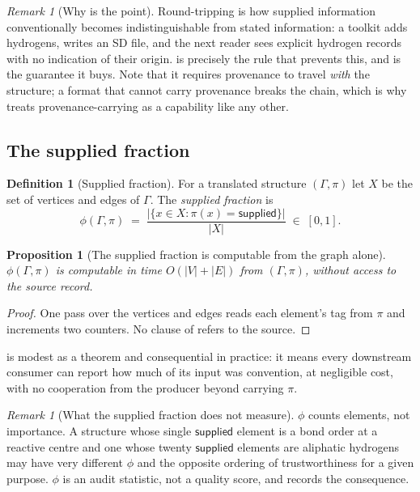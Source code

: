 \documentclass[11pt,twocolumn,a4paper]{article}
\theoremstyle{msthm}
\newtheorem{proposition}[theorem]{Proposition}
\theoremstyle{definition}
\newtheorem{definition}[theorem]{Definition}
\theoremstyle{remark}
\newtheorem{remark}[theorem]{Remark}
\newcommand{\Gph}{\Gamma}
\newcommand{\V}{V}
\newcommand{\E}{E}
\newcommand{\Prov}{\pi}
\newcommand{\abs}[1]{\lvert#1\rvert}
\newcommand{\supplied}{\textsf{supplied}}
\begin{document}
\begin{remark}[Why  is the point]
\label{rem:roundtrip-why}
Round-tripping is how supplied information conventionally becomes
indistinguishable from stated information: a toolkit adds hydrogens,
writes an SD file, and the next reader sees explicit hydrogen records
with no indication of their origin.  is precisely
the rule that prevents this, and  is the guarantee
it buys. Note that it requires provenance to travel \emph{with} the
structure; a format that cannot carry provenance breaks the chain, which
is why  treats provenance-carrying as a capability
like any other.
\end{remark}

\subsection{The supplied fraction}

\begin{definition}[Supplied fraction]
\label{def:suppfrac}
For a translated structure $(\Gph,\Prov)$ let $X$ be the set of vertices
and edges of $\Gph$. The \emph{supplied fraction} is
\[
\phi(\Gph,\Prov)\;=\;\frac{\abs{\{x\in X : \Prov(x)=\supplied\}}}
{\abs{X}}\;\in\;[0,1].
\]
\end{definition}

\begin{proposition}[The supplied fraction is computable from the graph
alone]
\label{prop:supplied-computable}
$\phi(\Gph,\Prov)$ is computable in time $O(\abs{\V}+\abs{\E})$ from
$(\Gph,\Prov)$, without access to the source record.
\end{proposition}

\begin{proof}
One pass over the vertices and edges reads each element's tag from
$\Prov$ and increments two counters. No clause of 
refers to the source.
\end{proof}

 is modest as a theorem and consequential
in practice: it means every downstream consumer can report how much of
its input was convention, at negligible cost, with no cooperation from
the producer beyond carrying $\Prov$.

\begin{remark}[What the supplied fraction does not measure]
\label{rem:suppfrac-limits}
$\phi$ counts elements, not importance. A structure whose single
$\supplied$ element is a bond order at a reactive centre and one whose
twenty $\supplied$ elements are aliphatic hydrogens may have very
different $\phi$ and the opposite ordering of trustworthiness for a
given purpose. $\phi$ is an audit statistic, not a quality score, and
 records the consequence.
\end{remark}
\end{document}
